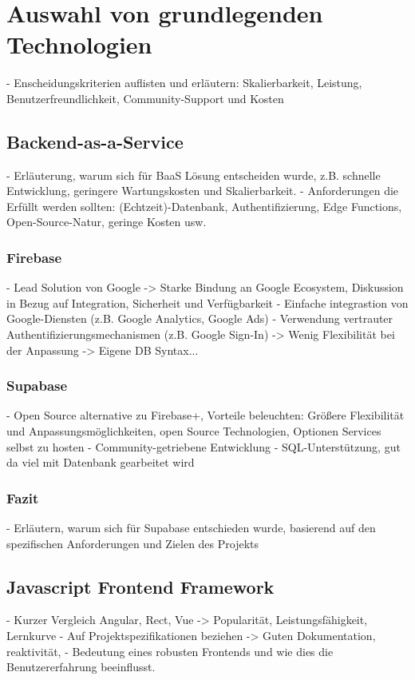\section{Auswahl von grundlegenden Technologien}

- Enscheidungskriterien auflisten und erläutern: Skalierbarkeit, Leistung, Benutzerfreundlichkeit, Community-Support und Kosten


\subsection{Backend-as-a-Service}
- Erläuterung, warum sich für BaaS Lösung entscheiden wurde, z.B. schnelle Entwicklung, geringere Wartungskosten und Skalierbarkeit.
- Anforderungen die Erfüllt werden sollten: (Echtzeit)-Datenbank, Authentifizierung, Edge Functions, Open-Source-Natur, geringe Kosten usw.

\subsubsection{Firebase}
- Lead Solution von Google -> Starke Bindung an Google Ecosystem, Diskussion in Bezug auf Integration, Sicherheit und Verfügbarkeit
- Einfache integrastion von Google-Diensten (z.B. Google Analytics, Google Ads)
- Verwendung vertrauter Authentifizierungsmechanismen (z.B. Google Sign-In)
-> Wenig Flexibilität bei der Anpassung
-> Eigene DB Syntax...

\subsubsection{Supabase}
- Open Source alternative zu Firebase+, Vorteile beleuchten: Größere Flexibilität und Anpassungsmöglichkeiten, open Source Technologien, Optionen Services selbst zu hosten
- Community-getriebene Entwicklung
- SQL-Unterstützung, gut da viel mit Datenbank gearbeitet wird

\subsubsection{Fazit}
- Erläutern, warum sich für Supabase entschieden wurde, basierend auf den spezifischen Anforderungen und Zielen des Projekts

\subsection{Javascript Frontend Framework}

- Kurzer Vergleich Angular, Rect, Vue ->  Popularität, Leistungsfähigkeit, Lernkurve 
- Auf Projektspezifikationen beziehen ->  Guten Dokumentation, reaktivität,
- Bedeutung eines robusten Frontends und wie dies die Benutzererfahrung beeinflusst.

